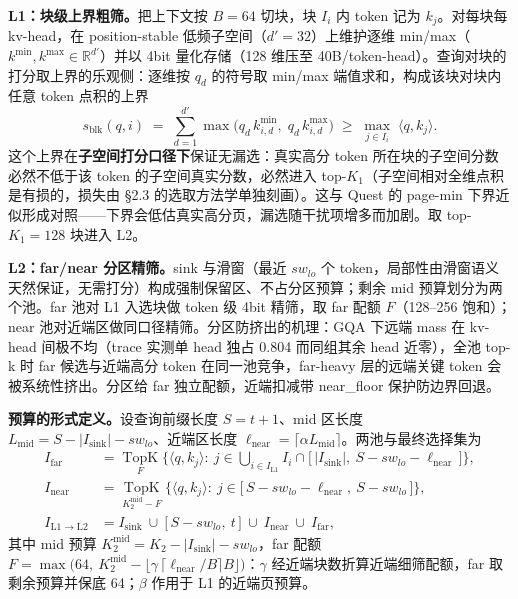 \documentclass[11pt]{article}
\begin{document}
\textbf{L1：块级上界粗筛。}把上下文按 $B{=}64$ 切块，块 $I_i$ 内 token 记为 $k_j$。对每块每 kv-head，在 position-stable 低频子空间（$d'{=}32$）上维护逐维 min/max（$k^{\min}, k^{\max}\in\mathbb{R}^{d'}$）并以 4bit 量化存储（128 维压至 40B/token-head）。查询对块的打分取上界的乐观侧：逐维按 $q_d$ 的符号取 min/max 端值求和，构成该块对块内任意 token 点积的上界
\begin{equation}
s_{\mathrm{blk}}(q, i) \;=\; \sum_{d=1}^{d'} \max\!\big(q_d\, k^{\min}_{i,d},\; q_d\, k^{\max}_{i,d}\big)\;\geq\; \max_{j\in I_i}\; \langle q, k_j \rangle.
\end{equation}
这个上界在\textbf{子空间打分口径下}保证无漏选：真实高分 token 所在块的子空间分数必然不低于该 token 的子空间真实分数，必然进入 top-$K_1$（子空间相对全维点积是有损的，损失由 §2.3 的选取方法学单独刻画）。这与 Quest 的 page-min 下界近似形成对照——下界会低估真实高分页，漏选随干扰项增多而加剧。取 top-$K_1{=}128$ 块进入 L2。

\textbf{L2：far/near 分区精筛。}sink 与滑窗（最近 $sw_{lo}$ 个 token，局部性由滑窗语义天然保证，无需打分）构成强制保留区、不占分区预算；剩余 mid 预算划分为两个池。far 池对 L1 入选块做 token 级 4bit 精筛，取 far 配额 $F$（128--256 饱和）；near 池对近端区做同口径精筛。分区防挤出的机理：GQA 下远端 mass 在 kv-head 间极不均（trace 实测单 head 独占 0.804 而同组其余 head 近零），全池 top-k 时 far 候选与近端高分 token 在同一池竞争，far-heavy 层的远端关键 token 会被系统性挤出。分区给 far 独立配额，近端扣减带 near\_floor 保护防边界回退。

\textbf{预算的形式定义。}设查询前缀长度 $S=t+1$、mid 区长度 $L_{\mathrm{mid}}=S-|I_{\mathrm{sink}}|-sw_{lo}$、近端区长度 $\ell_{\mathrm{near}}=\lceil\alpha L_{\mathrm{mid}}\rceil$。两池与最终选择集为
\begin{align}
I_{\mathrm{far}} &= \operatorname*{TopK}_{F}\Big\{\langle q,k_j\rangle:\ j\in\bigcup\nolimits_{i\in I_{\mathrm{L1}}} I_i\cap\big[\,|I_{\mathrm{sink}}|,\ S-sw_{lo}-\ell_{\mathrm{near}}\,\big]\Big\},\\
I_{\mathrm{near}} &= \operatorname*{TopK}_{K_2^{\mathrm{mid}}-F}\Big\{\langle q,k_j\rangle:\ j\in\big[\,S-sw_{lo}-\ell_{\mathrm{near}},\ S-sw_{lo}\,\big]\Big\},\\
I_{\mathrm{L1}\rightarrow\mathrm{L2}} &= I_{\mathrm{sink}}\ \cup\ \big[\,S-sw_{lo},\ t\,\big]\ \cup\ I_{\mathrm{near}}\ \cup\ I_{\mathrm{far}},
\end{align}
其中 mid 预算 $K_2^{\mathrm{mid}}=K_2-|I_{\mathrm{sink}}|-sw_{lo}$，far 配额 $F=\max\big(64,\ K_2^{\mathrm{mid}}-\lfloor\gamma\,\lceil\ell_{\mathrm{near}}/B\rceil B\rfloor\big)$：$\gamma$ 经近端块数折算近端细筛配额，far 取剩余预算并保底 64；$\beta$ 作用于 L1 的近端页预算。
\end{document}

